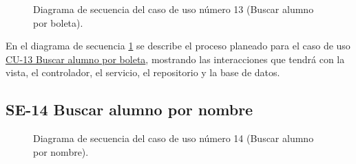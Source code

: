 \begin{figure}[htbp!]
	\begin{center}
		\caption{Diagrama de secuencia del caso de uso número 13 (Buscar alumno por boleta).}
		\label{fig:Diagrama de secuencia CU-13}
	\end{center}
\end{figure}

En el diagrama de secuencia \ref{fig:Diagrama de secuencia CU-13} se describe el proceso planeado para el caso de uso \hyperlink{CU-13}{CU-13 Buscar alumno por boleta}, mostrando las interacciones que tendrá con la vista, el controlador, el servicio, el repositorio y la base de datos.

\newpage

\subsection{SE-14 Buscar alumno por nombre}

\begin{figure}[htbp!]
	\begin{center}
		\caption{Diagrama de secuencia del caso de uso número 14 (Buscar alumno por nombre).}
		\label{fig:Diagrama de secuencia CU-14}
	\end{center}
\end{figure}

